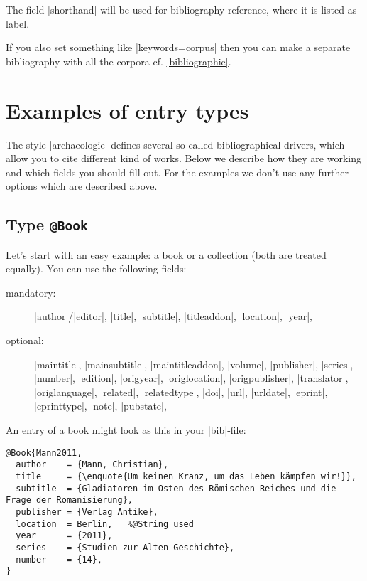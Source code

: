 \documentclass[a4paper,
10pt,
greek,
french,
spanish,
italian,
ngerman,
english
]{ltxdoc}
\begin{document}
The field |shorthand| will be used for bibliography reference,
where it is listed as label.

If you also set something like |keywords={corpus}| then you can make a separate bibliography with all the corpora cf. \cref{bibliographie}.



\section{Examples of entry types}\label{beispiele}
The style |archaeologie| defines several so-called bibliographical drivers,
which allow you to cite different kind of works.
Below we describe how they are working and which fields you should fill out.
For the examples we don't use any further options which are described above.

\subsection{Type \texttt{@Book}}\label{book}
Let’s start with an easy example: 
a book or a collection (both are treated equally).
You can use the following fields:
\begin{description}
\item[mandatory:] 
|author|/|editor|, 
|title|, |subtitle|, |titleaddon|,
|location|, |year|,
\item[optional:]
|maintitle|, |mainsubtitle|, |maintitleaddon|, |volume|, 
|publisher|, |series|, |number|, |edition|, 
|origyear|, |origlocation|, |origpublisher|, 
|translator|, |origlanguage|,
|related|, |relatedtype|,
|doi|, |url|, |urldate|, |eprint|, |eprinttype|, |note|, |pubstate|, 
 \end{description}
 
 
An entry of a book might look as this in your |bib|-file:
\begin{lstlisting}[style=bibentry,label=Mann2011,caption={{@}Book\{Mann2011,…\} }]
@Book{Mann2011,
  author    = {Mann, Christian},
  title     = {\enquote{Um keinen Kranz, um das Leben kämpfen wir!}},
  subtitle  = {Gladiatoren im Osten des Römischen Reiches und die Frage der Romanisierung},
  publisher = {Verlag Antike},
  location  = Berlin, 	%@String used
  year      = {2011},
  series    = {Studien zur Alten Geschichte},
  number    = {14},
}
\end{lstlisting}
\end{document}
